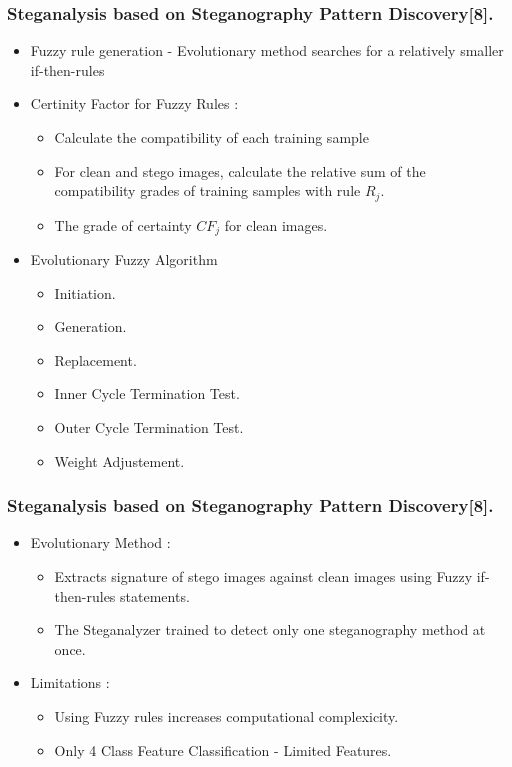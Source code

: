 \documentclass{beamer} %
\theoremstyle{definition} %
\begin{document}
\begin{frame}
\frametitle{Steganalysis based on Steganography Pattern Discovery[8].}
\begin{itemize}
	\item Fuzzy rule generation - Evolutionary method searches for a relatively smaller if-then-rules
	\item Certinity Factor for Fuzzy Rules : 
	\begin{itemize}
	    \item Calculate the compatibility of each training sample
	    \item For clean and stego images, calculate the relative sum of the compatibility grades of training samples with rule $R_j$.
	    \item The grade of certainty $CF_j$ for clean images.
	\end{itemize}
    \item Evolutionary Fuzzy Algorithm 
    \begin{itemize}
    	\item Initiation.
    	\item Generation.
    	\item Replacement.
    	\item Inner Cycle Termination Test.
    	\item Outer Cycle Termination Test.
    	\item Weight Adjustement.
    \end{itemize}
\end{itemize}
\end{frame}

\begin{frame}
\frametitle{Steganalysis based on Steganography Pattern Discovery[8].}
\begin{itemize}
		\item Evolutionary Method : 
		\begin{itemize}
			\item Extracts signature of stego images against clean images using Fuzzy if-then-rules statements.
			\item The Steganalyzer trained to detect only one steganography method at once.
		\end{itemize}
	    \item Limitations : 
	    \begin{itemize}
	    	\item Using Fuzzy rules increases computational complexicity.
	    	\item Only 4 Class Feature Classification - Limited Features.
	    \end{itemize}
\end{itemize}
\end{frame}
\end{document}
